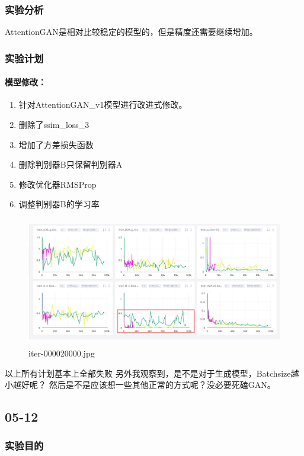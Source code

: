 \subsubsection{实验分析}

AttentionGAN是相对比较稳定的模型的，但是精度还需要继续增加。

\subsubsection{实验计划}

\paragraph{\textbf{模型修改：}}
\begin{enumerate}[1.]
	\item 针对AttentionGAN\_v1模型进行改进式修改。
	\item 删除了ssim\_loss\_3
	\item 增加了方差损失函数
	\item 删除判别器B只保留判别器A
	\item 修改优化器RMSProp
	\item 调整判别器B的学习率
\end{enumerate}
\begin{figure}
	\centering
	\includegraphics[width=360pt,height=160pt]{0320//1}
	\caption{iter-000020000.jpg}
\end{figure}
以上所有计划基本上全部失败
另外我观察到，是不是对于生成模型，Batchsize越小越好呢？
然后是不是应该想一些其他正常的方式呢？没必要死磕GAN。



\newpage



\subsection{05-12}

\subsubsection{实验目的}

